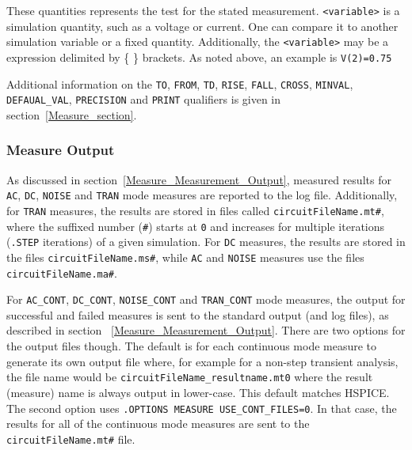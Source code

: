 \begin{Command}
\begin{Arguments}

These quantities represents the test for the stated
measurement.  \texttt{<variable>} is a simulation quantity, such as a
voltage or current.  One can compare it to another simulation variable
or a fixed quantity.  Additionally, the \texttt{<variable>} may be
a \Xyce{} expression delimited by \{ \} brackets.  As noted above, an
example is {\tt V(2)=0.75}
\end{Arguments}

Additional information on the \texttt{TO}, \texttt{FROM}, \texttt{TD},
\texttt{RISE}, \texttt{FALL}, \texttt{CROSS}, \texttt{MINVAL},
\texttt{DEFAUAL\_VAL}, \texttt{PRECISION} and \texttt{PRINT} qualifiers
is given in section~\ref{Measure_section}.

\end {Command}

\subsubsection{Measure Output}
\label{Measure_CONT_Measurement_Output}
As discussed in section~\ref{Measure_Measurement_Output}, measured results
for \texttt{AC}, \texttt{DC}, \texttt{NOISE} and \texttt{TRAN} mode measures
are reported to the log file.  Additionally, for \texttt{TRAN} measures, the
results are stored in files called \texttt{circuitFileName.mt\#}, where the
suffixed number (\texttt{\#}) starts at \texttt{0} and increases for multiple
iterations (\texttt{.STEP} iterations) of a given simulation. For \texttt{DC}
measures, the results are stored in the files \texttt{circuitFileName.ms\#},
while \texttt{AC} and \texttt{NOISE} measures use the files
\texttt{circuitFileName.ma\#}.

For \texttt{AC\_CONT}, \texttt{DC\_CONT}, \texttt{NOISE\_CONT} and
\texttt{TRAN\_CONT} mode measures, the output for successful and failed
measures is sent to the standard output (and log files), as described in
section ~\ref{Measure_Measurement_Output}.  There are two options for the
output files though. The default is for each continuous mode measure to generate its
own output file where, for example for a non-step transient analysis, the file name
would be \texttt{circuitFileName\_resultname.mt0} where the result (measure) name is
always output in lower-case. This default matches HSPICE. The second option uses
\texttt{.OPTIONS MEASURE USE\_CONT\_FILES=0}. In that case, the results for all
of the continuous mode measures are sent to the \texttt{circuitFileName.mt\#} file.

